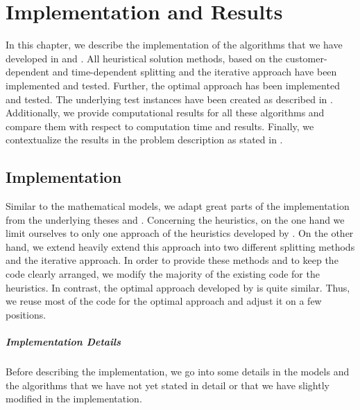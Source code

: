 \chapter{Implementation and Results}
\label{ch:implementation_results}

In this chapter, we describe the implementation of the algorithms that we have developed in  and . All heuristical solution methods, based on the customer-dependent and time-dependent splitting and the iterative approach have been implemented and tested. Further, the optimal approach has been implemented and tested. The underlying test instances have been created as described in . Additionally, we provide computational results for all these algorithms and compare them with respect to computation time and results. Finally, we contextualize the results in the problem description as stated in .


\section{Implementation}
\label{sec:implementation}

Similar to the mathematical models, we adapt great parts of the implementation from the underlying theses \cite{Kaiser} and \cite{Knoll}. Concerning the heuristics, on the one hand we limit ourselves to only one approach of the heuristics developed by \cite{Knoll}. On the other hand, we extend heavily extend this approach into two different splitting methods and the iterative approach. In order to provide these methods and to keep the code clearly arranged, we modify the majority of the existing code for the heuristics. In contrast, the optimal approach developed by \cite{Kaiser} is quite similar. Thus, we reuse most of the code for the optimal approach and adjust it on a few positions. 

\paragraph{Implementation Details} \parfill

Before describing the implementation, we go into some details in the models and the algorithms that we have not yet stated in detail or that we have slightly modified in the implementation.


